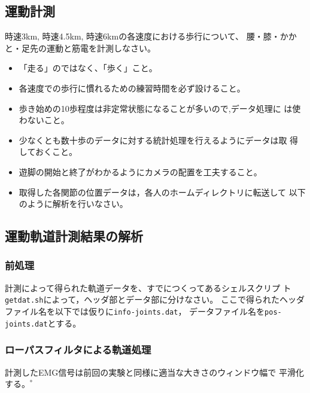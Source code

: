 \documentclass{jarticle}
\begin{document}
\subsection{運動計測}

時速3km, 時速4.5km, 時速6kmの各速度における歩行について、
腰・膝・かかと・足先の運動と筋電を計測しなさい。%
\begin{itemize}
\item 「走る」のではなく、「歩く」こと。
\item 各速度での歩行に慣れるための練習時間を必ず設けること。
\item 歩き始めの10歩程度は非定常状態になることが多いので,データ処理に
  は使わないこと。
\item 少なくとも数十歩のデータに対する統計処理を行えるようにデータは取
  得しておくこと。
\item 遊脚の開始と終了がわかるようにカメラの配置を工夫すること。
\item 取得した各関節の位置データは，各人のホームディレクトリに転送して
  以下のように解析を行いなさい。
\end{itemize}

\subsection{運動軌道計測結果の解析}


\subsubsection{前処理}

計測によって得られた軌道データを、すでにつくってあるシェルスクリプ
  ト\verb|getdat.sh|によって，ヘッダ部とデータ部に分けなさい。
ここで得られたヘッダファイル名を以下では仮りに\verb|info-joints.dat|，
データファイル名を\verb|pos-joints.dat|とする。

\subsubsection{ローパスフィルタによる軌道処理}
計測したEMG信号は前回の実験と同様に適当な大きさのウィンドウ幅で
平滑化する。゜
\end{document}
